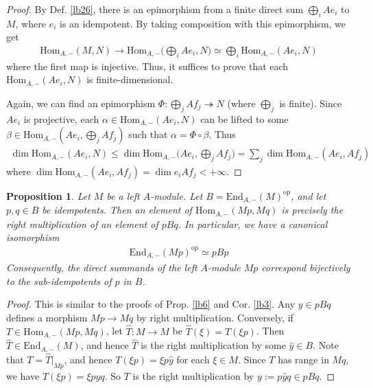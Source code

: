 \documentclass[11pt,b5paper,notitlepage]{article}
\theoremstyle{definition}
\theoremstyle{plain}
\newtheorem{pp}[df]{Proposition}
\newcommand{\wht}{\widehat}
\newcommand{\End}{\mathrm{End}} %
\newcommand{\Hom}{\mathrm{Hom}}
\newcommand{\opp}{\mathrm{op}}
\numberwithin{equation}{section}
\begin{document}
\begin{proof}
By Def. \ref{lb26}, there is an epimorphism from a finite direct sum $\bigoplus_i Ae_i$ to $M$, where $e_i$ is an idempotent. By taking composition with this epimorphism, we get
\begin{align}
\Hom_{A,-}(M,N)\rightarrow \Hom_{A,-}\Big(\bigoplus_i Ae_i,N\Big)\simeq\bigoplus_i \Hom_{A,-}(Ae_i,N)
\end{align}
where the first map is injective. Thus, it suffices to prove that each $\Hom_{A,-}(Ae_i,N)$ is finite-dimensional.

Again, we can find an epimorphism  $\Phi:\bigoplus_jAf_j\twoheadrightarrow N$ (where $\bigoplus_j$ is finite). Since $Ae_i$ is projective, each $\alpha\in\Hom_{A,-}(Ae_i,N)$ can be lifted to some $\beta\in\Hom_{A,-}(Ae_i,\bigoplus_j Af_j)$ such that $\alpha=\Phi\circ\beta$. Thus
\begin{align*}
\dim\Hom_{A,-}(Ae_i,N)\leq \dim\Hom_{A,-}\Big(Ae_i,\bigoplus_j Af_j\Big)=\sum_j \dim\Hom_{A,-}(Ae_i,Af_j)
\end{align*}
where $\dim\Hom_{A,-}(Ae_i,Af_j)=\dim e_iAf_j<+\infty$.
\end{proof}


\begin{pp}\label{lb30}
Let $M$ be a left $A$-module. Let $B=\End_{A,-}(M)^\opp$, and let $p,q\in B$ be idempotents. Then an element of $\Hom_{A,-}(Mp,Mq)$ is precisely the right multiplication of an element of $pBq$. In particular, we have a canonical isomorphism
\begin{align*}
\End_{A,-}(Mp)^\opp\simeq pBp
\end{align*}
Consequently, the direct summands of the left $A$-module $Mp$ correspond bijectively to the sub-idempotents of $p$ in $B$.
\end{pp}

\begin{proof}
This is similar to the proofs of Prop. \ref{lb6} and Cor. \ref{lb3}. Any $y\in pBq$ defines a morphism $Mp\rightarrow Mq$ by right multiplication. Conversely, if $T\in\Hom_{A,-}(Mp,Mq)$, let $\wht T:M\rightarrow M$ be $\wht T(\xi)=T(\xi p)$. Then $\wht T\in\End_{A,-}(M)$, and hence $\wht T$ is the right multiplication by some $\wht y\in B$. Note that $T=\wht T|_{Mp}$, and hence $T(\xi p)=\xi p \wht y$ for each $\xi\in M$. Since $T$ has range in $Mq$, we have $T(\xi p)=\xi p\wht yq$. So $T$ is the right multiplication by $y:=p\wht yq\in pBq$. 
\end{proof}
\end{document}
